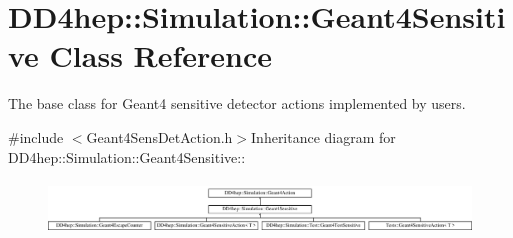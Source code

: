 \hypertarget{class_d_d4hep_1_1_simulation_1_1_geant4_sensitive}{
\section{DD4hep::Simulation::Geant4Sensitive Class Reference}
\label{class_d_d4hep_1_1_simulation_1_1_geant4_sensitive}
}


The base class for Geant4 sensitive detector actions implemented by users.  


{\ttfamily \#include $<$Geant4SensDetAction.h$>$}Inheritance diagram for DD4hep::Simulation::Geant4Sensitive::\begin{figure}[H]
\begin{center}
\leavevmode
\includegraphics[height=1.43345cm]{class_d_d4hep_1_1_simulation_1_1_geant4_sensitive}
\end{center}
\end{figure}
